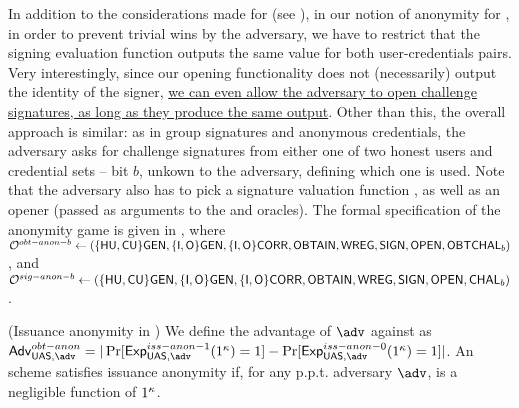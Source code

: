 In addition to the considerations made for \GSAC (see ),
in our notion of anonymity for \UAS,
in order to prevent trivial wins by the adversary, we have to restrict that the
signing evaluation function outputs the same value for both user-credentials
pairs. Very interestingly, since our opening functionality does not
(necessarily) output the identity of the signer, \uline{we can even allow the
  adversary to open challenge signatures, as long as they produce the same
  output}. Other than this, the overall approach is similar: as
in group signatures and anonymous credentials, the adversary asks for challenge
signatures from either one of two honest users and credential sets -- bit $b$,
unkown to the adversary, defining which one is used. Note that the adversary
also has to pick a signature valuation function \feval, as well as an opener
(passed as arguments to the \SIGN and \CHALb oracles). The formal specification
of the anonymity game is given in , where
$\mathcal{O}^{obt-anon-b} \gets (\lbrace\mathsf{HU},\mathsf{CU}\rbrace\mathsf{GEN},\lbrace\mathsf{I},\mathsf{O}\rbrace\mathsf{GEN},\lbrace\mathsf{I},
\mathsf{O}\rbrace\mathsf{CORR},\mathsf{OBTAIN},\mathsf{WREG},\mathsf{SIGN},\mathsf{OPEN},\mathsf{OBTCHAL}_b)$, and $\mathcal{O}^{sig-anon-b}
\gets (\lbrace\mathsf{HU},\mathsf{CU}\rbrace\mathsf{GEN},\lbrace\mathsf{I},\mathsf{O}\rbrace\mathsf{GEN},\lbrace\mathsf{I},\mathsf{O}\rbrace
\mathsf{CORR},\mathsf{OBTAIN},\mathsf{WREG},\mathsf{SIGN},\mathsf{OPEN},\mathsf{CHAL}_b)$.

\begin{figure*}[htp!]
  \centering
  \caption{Issuance and signature anonymity experiments for \UAS schemes.}
  \label{fig:exp-uas-anonb}
\end{figure*}

\begin{definition}{(Issuance anonymity in \UAS)}
  \label{def:issue-anonymity-uas}  
  We define the advantage \AdvIssAnon of $\adv$ against \ExpIssAnonb as
  $\AdvIssAnon=|\Pr\lbrack\ExpIssAnono(1^\secpar)=1\rbrack-
  \Pr\lbrack\ExpIssAnonz(1^\secpar)=1\rbrack|$.
  An \UAS scheme satisfies issuance anonymity if, for any p.p.t. adversary
  $\adv$, \AdvIssAnon is a negligible function of $1^\kappa$.
\end{definition}

